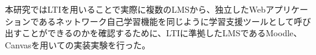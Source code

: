 \label{tag:experiment}
本研究ではLTIを用いることで実際に複数のLMSから、独立したWebアプリケーションであるネットワーク自己学習機能を同じように学習支援ツールとして呼び出すことができるのかを確認するために、LTIに準拠したLMSであるMoodle、Canvasを用いての実装実験を行った。\\
